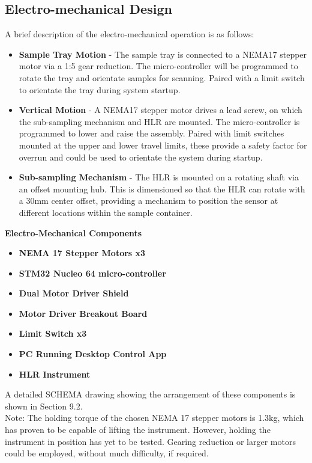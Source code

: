 \documentclass{UoNMCHA}
\numberwithin{equation}{section}
\begin{document}
\subsection{Electro-mechanical Design}
A brief description of the electro-mechanical operation is as follows:\\
\begin{itemize}
	\item \textbf{Sample Tray Motion} - The sample tray is connected to a NEMA17 stepper motor via a 1:5 gear reduction. The micro-controller will be programmed to rotate the tray and orientate samples for scanning. Paired with a limit switch to orientate the tray during system startup.
	\item \textbf{Vertical Motion} - A NEMA17 stepper motor drives a lead screw, on which the sub-sampling mechanism and HLR are mounted. The micro-controller is programmed to lower and raise the assembly. Paired with limit switches mounted at the upper and lower travel limits, these provide a safety factor for overrun and could be used to orientate the system during startup.
	\item \textbf{Sub-sampling Mechanism} - The HLR is mounted on a rotating shaft via an offset mounting hub. This is dimensioned so that the HLR can rotate with a 30mm center offset, providing a mechanism to position the sensor at different locations within the sample container.
\end{itemize}
\textbf{Electro-Mechanical Components}\\
\begin{itemize}
	\item \textbf{NEMA 17 Stepper Motors x3}
	\item \textbf{STM32 Nucleo 64 micro-controller}
	\item \textbf{Dual Motor Driver Shield}
	\item \textbf{Motor Driver Breakout Board}
	\item \textbf{Limit Switch x3}
	\item \textbf{PC Running Desktop Control App}
	\item \textbf{HLR Instrument}
\end{itemize}
A detailed SCHEMA drawing showing the arrangement of these components is shown in Section 9.2.\\
Note: The holding torque of the chosen NEMA 17 stepper motors is 1.3kg, which has proven to be capable of lifting the instrument. However, holding the instrument in position has yet to be tested. Gearing reduction or larger motors could be employed, without much difficulty, if required.\\
\end{document}
